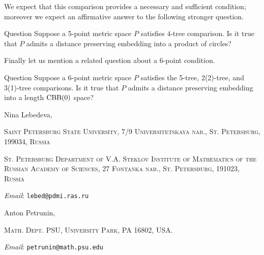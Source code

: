 \documentclass{article}
\makeatletter
\newcommand{\Addresses}{{\bigskip\footnotesize

\noindent Nina Lebedeva,
\par\nopagebreak
 \textsc{Saint Petersburg State University, 7/9 Universitetskaya nab., St. Petersburg, 199034, Russia}
\par
\nopagebreak
 \textsc{St. Petersburg Department of V.A. Steklov Institute of Mathematics of the Russian Academy of Sciences, 27 Fontanka nab., St. Petersburg, 191023, Russia}
  \par\nopagebreak
  \textit{Email}: \texttt{lebed@pdmi.ras.ru}

\medskip

\noindent   Anton Petrunin, 
\par\nopagebreak
 \textsc{Math. Dept. PSU, University Park, PA 16802, USA.}
  \par\nopagebreak
  \textit{Email}: \texttt{petrunin@math.psu.edu}
  
}}
\makeatother
\begin{document}
We expect that this comparison provides a necessary and sufficient condition; moreover we expect an affirmative answer to the following stronger question.


\begin{thm}{Question}
Suppose a 5-point metric space $P$ satisfies $4$-tree comparison.
Is it true that $P$ admits a distance preserving embedding into a product of circles?
\end{thm}

Finally let us mention a related question about a 6-point condition. 

\begin{thm}{Question}
Suppose a 6-point metric space $P$ satisfies the 5-tree, 2(2)-tree, and 3(1)-tree comparisons.
Is it true that $P$ admits a distance preserving embedding into a length $\mathrm{CBB}(0)$ space?
\end{thm}

{\sloppy
\printbibliography[heading=bibintoc]
\fussy
}

\Addresses
\end{document}
